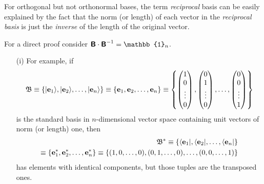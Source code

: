 For orthogonal but not orthonormal bases, the term {\em reciprocal} basis
can be easily explained by the fact that the norm (or length) of each vector in the {\em reciprocal basis}
is just the {\em inverse} of the length of the original vector.

{\color{OliveGreen}
\bproof
For a direct proof  consider $\textsf{\textbf{B}}\cdot \textsf{\textbf{B}}^{-1} =\mathbb{1}_n$.
\eproof
}


{\color{blue}
\bexample
\begin{itemize}
\item[(i)]
For example,
if
\begin{equation}
{\frak B}
\equiv
\{ \vert {\bf e}_1 \rangle ,\vert  {\bf e}_2\rangle ,\ldots ,\vert {\bf e}_n\rangle  \}
\equiv
\{{\bf e}_1, {\bf e}_2,\ldots ,{\bf e}_n\}
\equiv
\left\{
\begin{pmatrix}
1\\
0\\
\vdots \\
0
\end{pmatrix}
,
\begin{pmatrix}
0\\
1\\
\vdots \\
0
\end{pmatrix}
,
\ldots ,
\begin{pmatrix}
0\\
0\\
\vdots \\
1
\end{pmatrix}
\right\}
\end{equation}
is the standard basis in $n$-dimensional vector space containing unit vectors of norm (or length) one,
then
\begin{equation}
\begin{split}
{\frak B}^\ast
\equiv
\{ \langle {\bf e}_1 \vert , \langle {\bf e}_2 \vert , \ldots ,\langle {\bf e}_n \vert \}
\\
\equiv
\{{\bf e}_1^\ast  ,{\bf e}_2^\ast , \ldots ,{\bf e}_n^\ast  \}
\equiv
\left\{
(1,0,\ldots,0),
(0,1,\ldots,0),
\ldots,
(0,0,\ldots,1)
\right\}
\end{split}
\end{equation}
has elements with identical components,
but those tuples are the transposed ones.


\end{itemize}}
